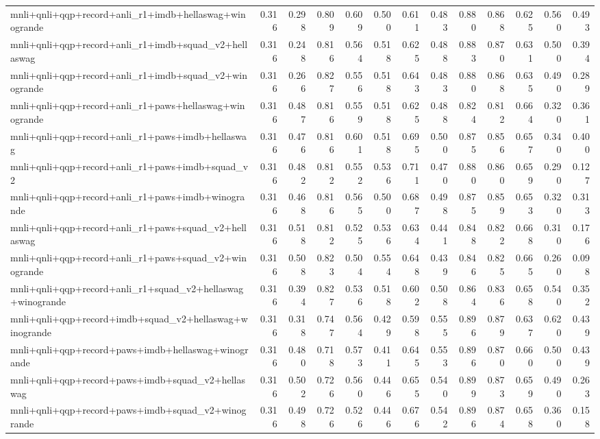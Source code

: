 \begin{table}[t]
\begin{tabular}{lrrrrrrrrrrrr}
    mnli+qnli+qqp+record+anli\_r1+imdb+hellaswag+winogrande & 0.316 & 0.298 & 0.809 & 0.609 & 0.500 & 0.611 & 0.483 & 0.880 & 0.868 & 0.625 & 0.560 & 0.493 \\
    mnli+qnli+qqp+record+anli\_r1+imdb+squad\_v2+hellaswag & 0.316 & 0.248 & 0.816 & 0.564 & 0.518 & 0.625 & 0.488 & 0.883 & 0.870 & 0.631 & 0.500 & 0.394 \\
    mnli+qnli+qqp+record+anli\_r1+imdb+squad\_v2+winogrande & 0.316 & 0.266 & 0.827 & 0.556 & 0.518 & 0.643 & 0.483 & 0.880 & 0.868 & 0.635 & 0.490 & 0.289 \\
    mnli+qnli+qqp+record+anli\_r1+paws+hellaswag+winogrande & 0.316 & 0.487 & 0.816 & 0.559 & 0.518 & 0.625 & 0.488 & 0.824 & 0.812 & 0.664 & 0.320 & 0.361 \\
    mnli+qnli+qqp+record+anli\_r1+paws+imdb+hellaswag & 0.316 & 0.476 & 0.816 & 0.601 & 0.518 & 0.695 & 0.500 & 0.875 & 0.856 & 0.657 & 0.340 & 0.400 \\
    mnli+qnli+qqp+record+anli\_r1+paws+imdb+squad\_v2 & 0.316 & 0.482 & 0.812 & 0.552 & 0.536 & 0.711 & 0.470 & 0.880 & 0.860 & 0.659 & 0.290 & 0.127 \\
    mnli+qnli+qqp+record+anli\_r1+paws+imdb+winogrande & 0.316 & 0.468 & 0.816 & 0.565 & 0.500 & 0.687 & 0.498 & 0.875 & 0.859 & 0.653 & 0.320 & 0.313 \\
    mnli+qnli+qqp+record+anli\_r1+paws+squad\_v2+hellaswag & 0.316 & 0.518 & 0.812 & 0.525 & 0.536 & 0.634 & 0.441 & 0.848 & 0.822 & 0.668 & 0.310 & 0.176 \\
    mnli+qnli+qqp+record+anli\_r1+paws+squad\_v2+winogrande & 0.316 & 0.508 & 0.823 & 0.504 & 0.554 & 0.648 & 0.439 & 0.846 & 0.825 & 0.665 & 0.260 & 0.098 \\
    mnli+qnli+qqp+record+anli\_r1+squad\_v2+hellaswag+winogrande & 0.316 & 0.394 & 0.827 & 0.536 & 0.518 & 0.602 & 0.508 & 0.864 & 0.836 & 0.658 & 0.540 & 0.352 \\
    mnli+qnli+qqp+record+imdb+squad\_v2+hellaswag+winogrande & 0.316 & 0.318 & 0.747 & 0.564 & 0.429 & 0.598 & 0.555 & 0.896 & 0.879 & 0.637 & 0.620 & 0.439 \\
    mnli+qnli+qqp+record+paws+imdb+hellaswag+winogrande & 0.316 & 0.480 & 0.718 & 0.573 & 0.411 & 0.645 & 0.553 & 0.896 & 0.870 & 0.660 & 0.500 & 0.439 \\
    mnli+qnli+qqp+record+paws+imdb+squad\_v2+hellaswag & 0.316 & 0.502 & 0.726 & 0.560 & 0.446 & 0.655 & 0.540 & 0.899 & 0.873 & 0.659 & 0.490 & 0.263 \\
    mnli+qnli+qqp+record+paws+imdb+squad\_v2+winogrande & 0.316 & 0.498 & 0.726 & 0.526 & 0.446 & 0.676 & 0.542 & 0.896 & 0.874 & 0.658 & 0.360 & 0.158 \\

\end{tabular}
\end{table}
